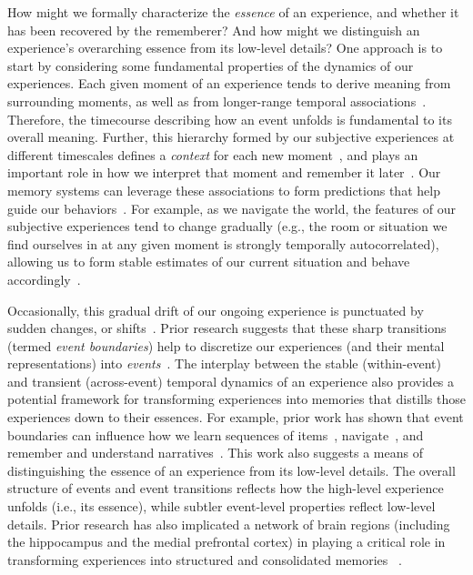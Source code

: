 \documentclass[10pt]{article}
\begin{document}
How might we formally characterize the \textit{essence} of an experience, and whether it has been recovered by the rememberer?  And how might we distinguish an experience's overarching essence from its low-level details?  One approach is to start by considering some fundamental properties of the dynamics of our experiences.  Each given moment of an experience tends to derive meaning from surrounding moments, as well as from longer-range temporal associations~\citep{LernEtal11, Mann19, Mann20}.  Therefore, the timecourse describing how an event unfolds is fundamental to its overall meaning.  Further, this hierarchy formed by our subjective experiences at different timescales defines a \textit{context} for each new moment~\citep[e.g.,][]{HowaKaha02a, HowaEtal14}, and plays an important role in how we interpret that moment and remember it later~\citep[for review see][]{MannEtal15, Mann20}.  Our memory systems can leverage these associations to form predictions that help guide our behaviors~\citep{RangRitc12}.  For example, as we navigate the world, the features of our subjective experiences tend to change gradually (e.g., the room or situation we find ourselves in at any given moment is strongly temporally autocorrelated), allowing us to form stable estimates of our current situation and behave accordingly~\citep{ZackEtal07, ZwaaRadv98}.

Occasionally, this gradual drift of our ongoing experience is punctuated by sudden changes, or shifts~\citep[e.g., when we walk through a doorway; ][]{RadvZack17}.  Prior research suggests that these sharp transitions (termed \textit{event boundaries}) help to discretize our experiences (and their mental representations) into \textit{events}~\citep{RadvZack17, BrunEtal18, HeusEtal18b, ClewDava17, EzzyDava11, DuBrDava13}.  The interplay between the stable (within-event) and transient (across-event) temporal dynamics of an experience also provides a potential framework for transforming experiences into memories that distills those experiences down to their essences.  For example, prior work has shown that event boundaries can influence how we learn sequences of items~\citep{HeusEtal18b, DuBrDava13}, navigate~\citep{BrunEtal18}, and remember and understand narratives~\citep{ZwaaRadv98, EzzyDava11}.  This work also suggests a means of distinguishing the essence of an experience from its low-level details.  The overall structure of events and event transitions reflects how the high-level experience unfolds (i.e., its essence), while subtler event-level properties reflect low-level details.  Prior research has also implicated a network of brain regions (including the hippocampus and the medial prefrontal cortex) in playing a critical role in transforming experiences into structured and consolidated memories ~\citep{TompDava17}.
\end{document}
